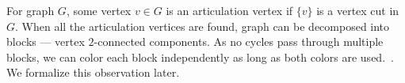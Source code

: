 For graph \( G \), some vertex \( v \in G \) is an articulation vertex if
\( \{v\} \) is a vertex cut in \( G \).
When all the articulation vertices are found,
graph can be decomposed into blocks
--- vertex \( 2 \)-connected components.
As no cycles pass through multiple blocks, we can color each block
independently as long as both colors are used.~\cite{my_paper}.
We formalize this observation later.

